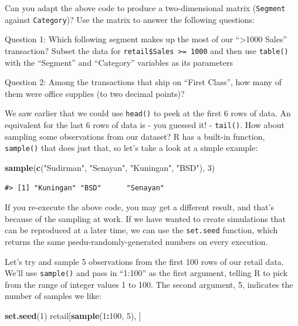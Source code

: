 \documentclass[]{article}
\newenvironment{Shaded}{\begin{snugshade}}{\end{snugshade}}
\newcommand{\DecValTok}[1]{\textcolor[rgb]{0.00,0.00,0.81}{#1}}
\newcommand{\KeywordTok}[1]{\textcolor[rgb]{0.13,0.29,0.53}{\textbf{#1}}}
\newcommand{\NormalTok}[1]{#1}
\newcommand{\OperatorTok}[1]{\textcolor[rgb]{0.81,0.36,0.00}{\textbf{#1}}}
\newcommand{\StringTok}[1]{\textcolor[rgb]{0.31,0.60,0.02}{#1}}
\begin{document}
Can you adapt the above code to produce a two-dimensional matrix
(\texttt{Segment} against \texttt{Category})? Use the matrix to answer
the following questions:

Question 1: Which following segment makes up the most of our
``\textgreater{}1000 Sales'' transaction? Subset the data for
\texttt{retail\$Sales\ \textgreater{}=\ 1000} and then use
\texttt{table()} with the ``Segment'' and ``Category'' variables as its
parameters

Question 2: Among the transactions that ship on ``First Class'', how
many of them were office supplies (to two decimal points)?

We saw earlier that we could use \texttt{head()} to peek at the first 6
rows of data. An equivalent for the last 6 rows of data is - you guessed
it! - \texttt{tail()}. How about sampling some observations from our
dataset? R has a built-in function, \texttt{sample()} that does just
that, so let's take a look at a simple example:

\begin{Shaded}
\begin{Highlighting}[]
\KeywordTok{sample}\NormalTok{(}\KeywordTok{c}\NormalTok{(}\StringTok{"Sudirman"}\NormalTok{, }\StringTok{"Senayan"}\NormalTok{, }\StringTok{"Kuningan"}\NormalTok{, }\StringTok{"BSD"}\NormalTok{), }\DecValTok{3}\NormalTok{)}
\end{Highlighting}
\end{Shaded}

\begin{verbatim}
#> [1] "Kuningan" "BSD"      "Senayan"
\end{verbatim}

If you re-execute the above code, you may get a different result, and
that's because of the sampling at work. If we have wanted to create
simulations that can be reproduced at a later time, we can use the
\texttt{set.seed} function, which returns the same
psedu-randomly-generated numbers on every execution.

Let's try and sample 5 observations from the first 100 rows of our
retail data. We'll use \texttt{sample()} and pass in ``1:100'' as the
first argument, telling R to pick from the range of integer values 1 to
100. The second argument, 5, indicates the number of samples we like:

\begin{Shaded}
\begin{Highlighting}[]
\KeywordTok{set.seed}\NormalTok{(}\DecValTok{1}\NormalTok{)}
\NormalTok{retail[}\KeywordTok{sample}\NormalTok{(}\DecValTok{1}\OperatorTok{:}\DecValTok{100}\NormalTok{, }\DecValTok{5}\NormalTok{), ]}
\end{Highlighting}
\end{Shaded}
\end{document}
